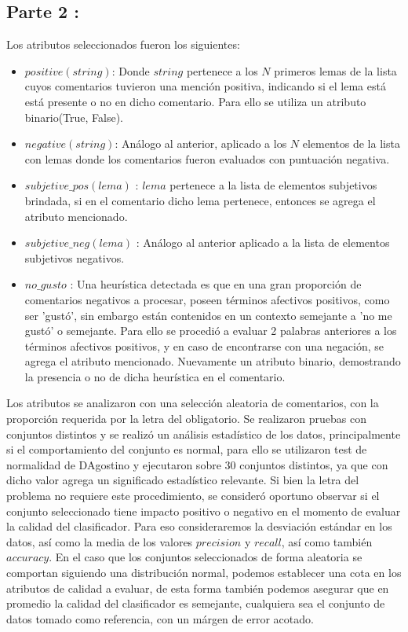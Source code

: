 \documentclass[12pt]{article}
\begin{document}
\subsection{Parte 2 :} \label{sub:part2}
Los atributos seleccionados fueron los siguientes:
\begin{itemize}
  \item $positive(string)$: Donde $string$ pertenece a los $N$ primeros lemas de la lista cuyos comentarios tuvieron una mención positiva, indicando si el lema está está presente o no en dicho comentario. Para ello se utiliza un atributo binario(True, False).
  \item $negative(string)$: Análogo al anterior, aplicado a los $N$ elementos de la lista con lemas donde los comentarios fueron evaluados con puntuación negativa.
  \item $subjetive\_pos(lema)$ : $lema$ pertenece a la lista de elementos subjetivos brindada, si en el comentario dicho lema pertenece, entonces se agrega el atributo mencionado.
  \item $subjetive\_neg(lema)$ : Análogo al anterior aplicado a la lista de elementos subjetivos negativos.
  \item $no\_gusto$ : Una heurística detectada es que en una gran proporción de comentarios negativos a procesar, poseen términos afectivos positivos, como ser 'gustó', sin embargo están contenidos en un contexto semejante a 'no me gustó' o semejante. Para ello se procedió a evaluar 2 palabras anteriores a los términos afectivos positivos, y en caso de encontrarse con una negación, se agrega el atributo mencionado. Nuevamente un atributo binario, demostrando la presencia o no de dicha heurística en el comentario.
\end{itemize}
Los atributos se analizaron con una selección aleatoria de comentarios, con la proporción requerida por la letra del obligatorio. Se realizaron pruebas con conjuntos distintos y se realizó un análisis estadístico de los datos, principalmente si el comportamiento del conjunto es normal, para ello se utilizaron test de normalidad de DAgostino y ejecutaron sobre 30 conjuntos distintos, ya que con dicho valor agrega un significado estadístico relevante. Si bien la letra del problema no requiere este procedimiento, se consideró oportuno observar si el conjunto seleccionado tiene impacto positivo o negativo en el momento de evaluar la calidad del clasificador. Para eso consideraremos la desviación estándar en los datos, así como la media de los valores $precision$ y $recall$, así como también $accuracy$. En el caso que los conjuntos seleccionados de forma aleatoria se comportan siguiendo una distribución normal, podemos establecer una cota en los atributos de calidad a evaluar, de esta forma también podemos asegurar que en promedio la calidad del clasificador es semejante, cualquiera sea el conjunto de datos tomado como referencia, con un márgen de error acotado.
\end{document}

